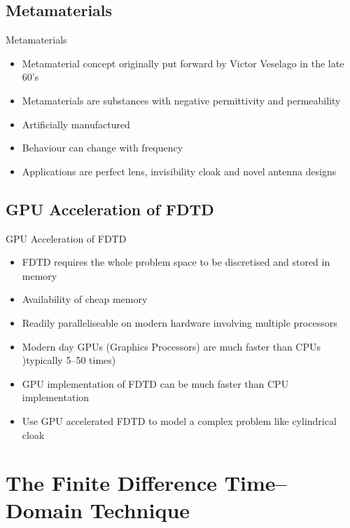 \documentclass{beamer}
\begin{document}
\subsection{Metamaterials}
\begin{frame}{Metamaterials}
	\begin{itemize}
	\item Metamaterial concept originally put forward by Victor Veselago in the late 60's \cite{Newelectronics-Metamaterial}
	\item Metamaterials are substances with negative permittivity and permeability
	\item Artificially manufactured
	\item Behaviour can change with frequency
	\item Applications are perfect lens, invisibility cloak and novel antenna designs
	\end{itemize}
\end{frame}
\subsection{GPU Acceleration of FDTD}
\begin{frame}{GPU Acceleration of FDTD}
	\begin{itemize}
	\item FDTD requires the whole problem space to be discretised and stored in memory
	\item Availability of cheap memory 
	\item Readily paralleliseable on modern hardware involving multiple processors
	\item Modern day GPUs (Graphics Processors) are much faster than CPUs )typically 5--50 times)
	\item GPU implementation of FDTD can be much faster than CPU implementation
	\item Use GPU accelerated FDTD to model a complex problem like cylindrical cloak
	\end{itemize}
\end{frame}

\section{The Finite Difference Time--Domain Technique}
\end{document}
